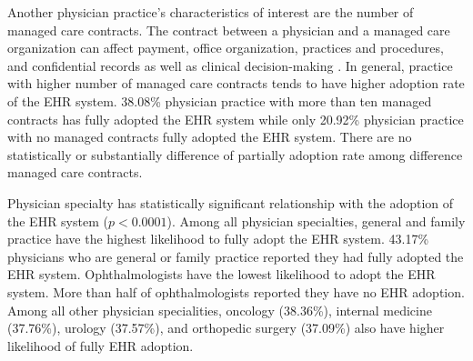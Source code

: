 \documentclass[12pt]{report}
\begin{document}
Another physician practice's characteristics of interest are the number of managed care contracts. The contract between a physician and a managed care organization can affect payment, office organization, practices and procedures, and confidential records as well as clinical decision-making \citep{mcc2008}. In general, practice with higher number of managed care contracts tends to have higher adoption rate of the EHR system. 38.08\% physician practice with more than ten managed contracts has fully adopted the EHR system while only 20.92\% physician practice with no managed contracts fully adopted the EHR system. There are no statistically or substantially difference of partially adoption rate among difference managed care contracts.

Physician specialty has statistically significant relationship with the adoption of the EHR system ($p < 0.0001$). Among all physician specialties, general and family practice have the highest likelihood to fully adopt the EHR system. 43.17\% physicians who are general or family practice reported they had fully adopted the EHR system. Ophthalmologists have the lowest likelihood to adopt the EHR system. More than half of ophthalmologists reported they have no EHR adoption. Among all other physician specialities, oncology (38.36\%), internal medicine (37.76\%), urology (37.57\%), and orthopedic surgery (37.09\%) also have higher likelihood of fully EHR adoption.
 
\end{document}
